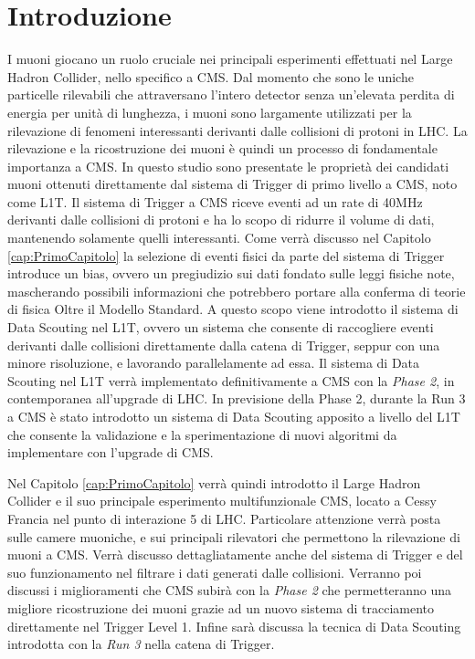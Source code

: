 \chapter{Introduzione}
\label{cap:Introduzione}

I muoni giocano un ruolo cruciale nei principali esperimenti effettuati nel Large Hadron Collider, nello specifico a CMS. Dal momento che sono le uniche particelle rilevabili che attraversano l'intero detector senza un'elevata perdita di energia per unità di lunghezza, i muoni sono largamente utilizzati per la rilevazione di fenomeni interessanti derivanti dalle collisioni di protoni in LHC. La rilevazione e la ricostruzione dei muoni è quindi un processo di fondamentale importanza a CMS.\newline
In questo studio sono presentate le proprietà dei candidati muoni ottenuti direttamente dal sistema di Trigger di primo livello a CMS, noto come L1T. Il sistema di Trigger a CMS riceve eventi ad un rate di 40MHz derivanti dalle collisioni di protoni e ha lo scopo di ridurre il volume di dati, mantenendo solamente quelli interessanti.
Come verrà discusso nel Capitolo \ref{cap:PrimoCapitolo} la selezione di eventi fisici da parte del sistema di Trigger introduce un bias, ovvero un pregiudizio sui dati fondato sulle leggi fisiche note, mascherando possibili informazioni che potrebbero portare alla conferma di teorie di fisica Oltre il Modello Standard. A questo scopo viene introdotto il sistema di Data Scouting nel L1T, ovvero un sistema che consente di raccogliere eventi derivanti dalle collisioni direttamente dalla catena di Trigger, seppur con una minore risoluzione, e lavorando parallelamente ad essa. Il sistema di Data Scouting nel L1T verrà implementato definitivamente a CMS con la \textit{Phase 2}, in contemporanea all'upgrade di LHC. In previsione della Phase 2, durante la Run 3 a CMS è stato introdotto un sistema di Data Scouting apposito a livello del L1T che consente la validazione e la sperimentazione di nuovi algoritmi da implementare con l'upgrade di CMS.

Nel Capitolo \ref{cap:PrimoCapitolo} verrà quindi introdotto il Large Hadron Collider e il suo principale esperimento multifunzionale CMS, locato a Cessy Francia nel punto di interazione 5 di LHC. Particolare attenzione verrà posta sulle camere muoniche, e sui principali rilevatori che permettono la rilevazione di muoni a CMS. Verrà discusso dettagliatamente anche del sistema di Trigger e del suo funzionamento nel filtrare i dati generati dalle collisioni. Verranno poi discussi i miglioramenti che CMS subirà con la \textit{Phase 2} che permetteranno una migliore ricostruzione dei muoni grazie ad un nuovo sistema di tracciamento direttamente nel Trigger Level 1. Infine sarà discussa la tecnica di Data Scouting introdotta con la \textit{Run 3} nella catena di Trigger.

